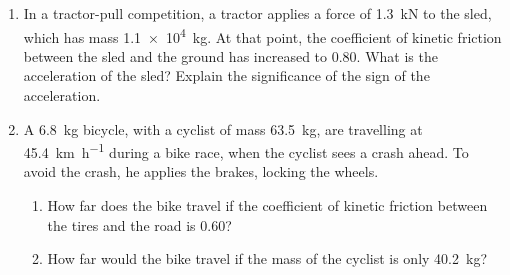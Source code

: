 \begin{enumerate}[itemsep=4pt]
\item In a tractor-pull competition, a tractor applies a force of
  \SI{1.3}{\kilo\newton} to the sled, which has mass \SI{1.1e4}{\kilo\gram}. At
  that point, the coefficient of kinetic friction between the sled and the
  ground has increased to 0.80. What is the acceleration of the sled? Explain
  the significance of the sign of the acceleration. 
  

\item A \SI{6.8}{\kilo\gram} bicycle, with a cyclist of mass
  \SI{63.5}{\kilo\gram}, are travelling at \SI{45.4}{\kilo\metre\per\hour}
  during a bike race, when the cyclist sees a crash ahead. To avoid the crash,
  he applies the brakes, locking the wheels.
  \begin{enumerate}[itemsep=4pt]
  \item How far does the bike travel if the coefficient of kinetic friction
    between the tires and the road is 0.60?
  \item How far would the bike travel if the mass of the cyclist is only
    \SI{40.2}{\kilo\gram}?
  \end{enumerate}




\end{enumerate}
